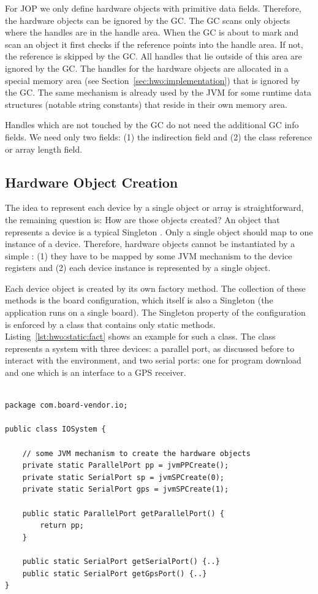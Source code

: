 For JOP we only define hardware objects with primitive data fields.
Therefore, the hardware objects can be ignored by the GC. The GC
scans only objects where the handles are in the handle area. When the
GC is about to mark and scan an object it first checks if the
reference points into the handle area. If not, the reference is
skipped by the GC. All handles that lie outside of this area are
ignored by the GC. The handles for the hardware objects are allocated
in a special memory area (see Section~\ref{sec:hwo:implementation})
that is ignored by the GC. The same mechanism is already used by the
JVM for some runtime data structures (notable string constants) that
reside in their own memory area.

Handles which are not touched by the GC do not need the additional GC
info fields. We need only two fields: (1) the indirection field and
(2) the class reference or array length field.

\subsection{Hardware Object Creation} \label{sec:factory} 

The idea to represent each device by a single object or array is
straightforward, the remaining question is: How are those objects
created? An object that represents a device is a typical Singleton
\cite{Go4}. Only a single object should map to one instance of a
device. Therefore, hardware objects cannot be instantiated by a
simple : (1) they have to be mapped by some JVM mechanism
to the device registers and (2) each device instance is represented
by a single object.

Each device object is created by its own factory method. The
collection of these methods is the board configuration, which itself
is also a Singleton (the application runs on a single board). The
Singleton property of the configuration is enforced by a class that
contains only static methods. Listing~\ref{lst:hwo:static:fact} shows
an example for such a class. The class  represents a
system with three devices: a parallel port, as discussed before to
interact with the environment, and two serial ports: one for program
download and one which is an interface to a GPS receiver.

\begin{lstlisting}[float=t,caption={A factory with static methods for Singleton hardware objects},
label=lst:hwo:static:fact]

package com.board-vendor.io;

public class IOSystem {

    // some JVM mechanism to create the hardware objects
    private static ParallelPort pp = jvmPPCreate();
    private static SerialPort sp = jvmSPCreate(0);
    private static SerialPort gps = jvmSPCreate(1);

    public static ParallelPort getParallelPort() {
        return pp;
    }

    public static SerialPort getSerialPort() {..}
    public static SerialPort getGpsPort() {..}
}
\end{lstlisting}


